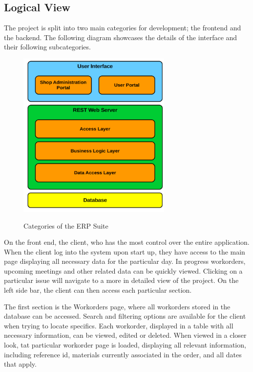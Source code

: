 {{{{\subsection{Logical View}
The project is split into two main categories for development; the frontend and the backend. The following diagram showcases the details of the interface and their following subcategories. 
\begin{figure}[h]
	\centering
	\includegraphics[width=3in]{front-back.png}\\
	\caption{Categories of the ERP Suite}
	\label{fig:tobias}
\end{figure}
\newline

On the front end, the client, who has the most control over the entire application. When the client log into the system upon start up, they have access to the main page displaying all necessary data for the particular day. In progress workorders, upcoming meetings and other related data can be quickly viewed. Clicking on a particular issue will navigate to a more in detailed view of the project. On the left side bar, the client can then access each particular section. 
\newline
{\setlength{\parindent}{0cm}

The first section is the Workorders page, where all workorders stored in the database can be accessed. Search and filtering options are available for the client when trying to locate specifics. Each workorder, displayed in a table with all necessary information, can be viewed, edited or deleted. When viewed in a closer look, tat particular workorder page is loaded, displaying all relevant information, including reference id, materials currently associated in the order, and all dates that apply. 
\newline
{\setlength{\parindent}{0cm}

}}}}}}
